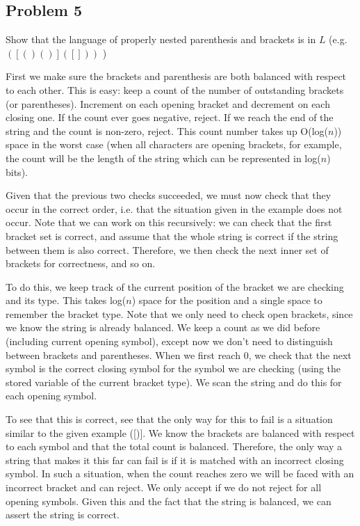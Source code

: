 \documentclass[english]{article}
\begin{document}
\subsection*{Problem 5}
Show that the language of properly nested parenthesis and brackets is in $L$ (e.g. $([()()]([]))$ )

First we make sure the brackets and parenthesis are both balanced with respect to each other.
This is easy: keep a count of the number of outstanding brackets (or parentheses). Increment on each
opening bracket and decrement on each closing one. If the count ever goes negative, reject. If we
reach the end of the string and the count is non-zero, reject. This count number takes up O(log($n$))
space in the worst case (when all characters are opening brackets, for example, the count will be
the length of the string which can be represented in log($n$) bits).

Given that the previous two checks succeeded, we must now check that they occur in the correct order,
i.e. that the situation given in the example does not occur. Note that we can work on this recursively:
we can check that the first bracket set is correct, and assume that the whole string is correct if the
string between them is also correct. Therefore, we then check the next inner set of brackets for
correctness, and so on.

To do this, we keep track of the current position of the bracket we are checking and its type.
This takes log($n$) space for the position and a single space to remember the bracket type.
Note that we only need to check open brackets, since we know the string is already balanced.
We keep a count as we did before (including current opening symbol), except now we don't need to
distinguish between brackets and parentheses. When we first reach 0, we check that the next symbol
is the correct closing symbol for the symbol we are checking (using the stored variable of the
current bracket type). We scan the string and do this for each opening symbol.

To see that this is correct, see that the only way for this to fail is a situation similar to the
given example ([)]. We know the brackets are balanced with respect to each symbol and that the total
count is balanced. Therefore, the only way a string that makes it this far can fail is if it is
matched with an incorrect closing symbol. In such a situation, when the count reaches zero we will
be faced with an incorrect bracket and can reject. We only accept if we do not reject for all
opening symbols. Given this and the fact that the string is balanced, we can assert the string is
correct.
\end{document}
